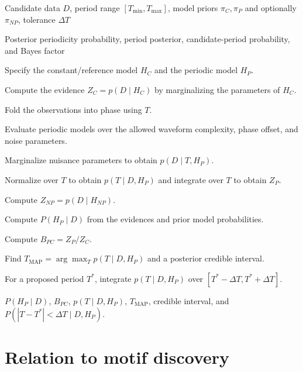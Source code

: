 \documentclass[a4paper]{article}
\begin{document}
\begin{algorithm}[H]
\caption{Bayesian periodicity detection for a candidate subsequence}
\begin{algorithmic}[1]

\Require Candidate data $D$, period range $[T_{\min},T_{\max}]$, model priors $\pi_C,\pi_P$ and optionally $\pi_{NP}$, tolerance $\Delta T$

\Ensure Posterior periodicity probability, period posterior, candidate-period probability, and Bayes factor

\State Specify the constant/reference model $H_C$ and the periodic model $H_P$.

\State Compute the evidence $Z_C=p(D\mid H_C)$ by marginalizing the parameters of $H_C$.


    \State Fold the observations into phase using $T$.

    \State Evaluate periodic models over the allowed waveform complexity, phase offset, and noise parameters.

    \State Marginalize nuisance parameters to obtain $p(D\mid T,H_P)$.

\EndFor

\State Normalize over $T$ to obtain $p(T\mid D,H_P)$ and integrate over $T$ to obtain $Z_P$.


    \State Compute $Z_{NP}=p(D\mid H_{NP})$.

\EndIf

\State Compute $P(H_P\mid D)$ from the evidences and prior model probabilities.

\State Compute $B_{PC}=Z_P/Z_C$.

\State Find $T_{\mathrm{MAP}}=\arg\max_T p(T\mid D,H_P)$ and a posterior credible interval.

\State For a proposed period $T^{\ast}$, integrate $p(T\mid D,H_P)$ over $[T^{\ast}-\Delta T,T^{\ast}+\Delta T]$.

\State \Return $P(H_P\mid D)$, $B_{PC}$, $p(T\mid D,H_P)$, $T_{\mathrm{MAP}}$, credible interval, and $P(|T-T^{\ast}|<\Delta T\mid D,H_P)$.

\end{algorithmic}
\end{algorithm}

\section{Relation to motif discovery}
\end{document}
